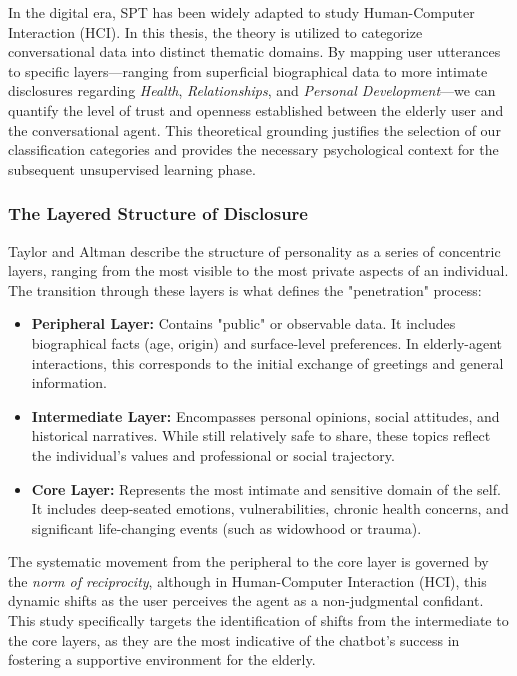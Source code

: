 In the digital era, SPT has been widely adapted to study Human-Computer Interaction (HCI). In this thesis, the theory is utilized to categorize conversational data into distinct thematic domains. By mapping user utterances to specific layers—ranging from superficial biographical data to more intimate disclosures regarding \textit{Health}, \textit{Relationships}, and \textit{Personal Development}—we can quantify the level of trust and openness established between the elderly user and the conversational agent. This theoretical grounding justifies the selection of our classification categories and provides the necessary psychological context for the subsequent unsupervised learning phase.


\subsubsection{The Layered Structure of Disclosure}

Taylor and Altman describe the structure of personality as a series of concentric layers, ranging from the most visible to the most private aspects of an individual. The transition through these layers is what defines the "penetration" process:

\begin{itemize}
    \item \textbf{Peripheral Layer:} Contains "public" or observable data. It includes biographical facts (age, origin) and surface-level preferences. In elderly-agent interactions, this corresponds to the initial exchange of greetings and general information.
    \item \textbf{Intermediate Layer:} Encompasses personal opinions, social attitudes, and historical narratives. While still relatively safe to share, these topics reflect the individual's values and professional or social trajectory.
    \item \textbf{Core Layer:} Represents the most intimate and sensitive domain of the self. It includes deep-seated emotions, vulnerabilities, chronic health concerns, and significant life-changing events (such as widowhood or trauma). 
\end{itemize}

The systematic movement from the peripheral to the core layer is governed by the \textit{norm of reciprocity}, although in Human-Computer Interaction (HCI), this dynamic shifts as the user perceives the agent as a non-judgmental confidant. This study specifically targets the identification of shifts from the intermediate to the core layers, as they are the most indicative of the chatbot's success in fostering a supportive environment for the elderly.



